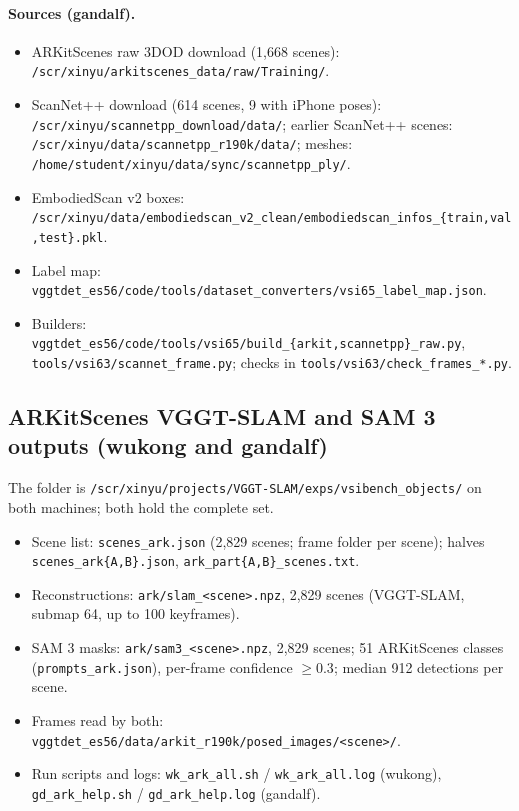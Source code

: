 \paragraph{Sources (gandalf).}
\begin{itemize}
\item ARKitScenes raw 3DOD download (1,668 scenes): \texttt{/scr/xinyu/arkitscenes\_data/raw/Training/}.
\item ScanNet++ download (614 scenes, 9 with iPhone poses): \texttt{/scr/xinyu/scannetpp\_download/data/};
      earlier ScanNet++ scenes: \texttt{/scr/xinyu/data/scannetpp\_r190k/data/}; meshes:
      \texttt{/home/student/xinyu/data/sync/scannetpp\_ply/}.
\item EmbodiedScan v2 boxes: \texttt{/scr/xinyu/data/embodiedscan\_v2\_clean/embodiedscan\_infos\_\{train,val,test\}.pkl}.
\item Label map: \texttt{vggtdet\_es56/code/tools/dataset\_converters/vsi65\_label\_map.json}.
\item Builders: \texttt{vggtdet\_es56/code/tools/vsi65/build\_\{arkit,scannetpp\}\_raw.py},
      \texttt{tools/vsi63/scannet\_frame.py}; checks in \texttt{tools/vsi63/check\_frames\_*.py}.
\end{itemize}

\subsection{ARKitScenes VGGT-SLAM and SAM 3 outputs (wukong and gandalf)}

The folder is \texttt{/scr/xinyu/projects/VGGT-SLAM/exps/vsibench\_objects/} on both machines; both hold the
complete set.
\begin{itemize}
\item Scene list: \texttt{scenes\_ark.json} (2,829 scenes; frame folder per scene); halves
      \texttt{scenes\_ark\{A,B\}.json}, \texttt{ark\_part\{A,B\}\_scenes.txt}.
\item Reconstructions: \texttt{ark/slam\_<scene>.npz}, 2,829 scenes (VGGT-SLAM, submap 64, up to 100 keyframes).
\item SAM 3 masks: \texttt{ark/sam3\_<scene>.npz}, 2,829 scenes; 51 ARKitScenes classes
      (\texttt{prompts\_ark.json}), per-frame confidence $\geq 0.3$; median 912 detections per scene.
\item Frames read by both: \texttt{vggtdet\_es56/data/arkit\_r190k/posed\_images/<scene>/}.
\item Run scripts and logs: \texttt{wk\_ark\_all.sh} / \texttt{wk\_ark\_all.log} (wukong),
      \texttt{gd\_ark\_help.sh} / \texttt{gd\_ark\_help.log} (gandalf).
\end{itemize}

